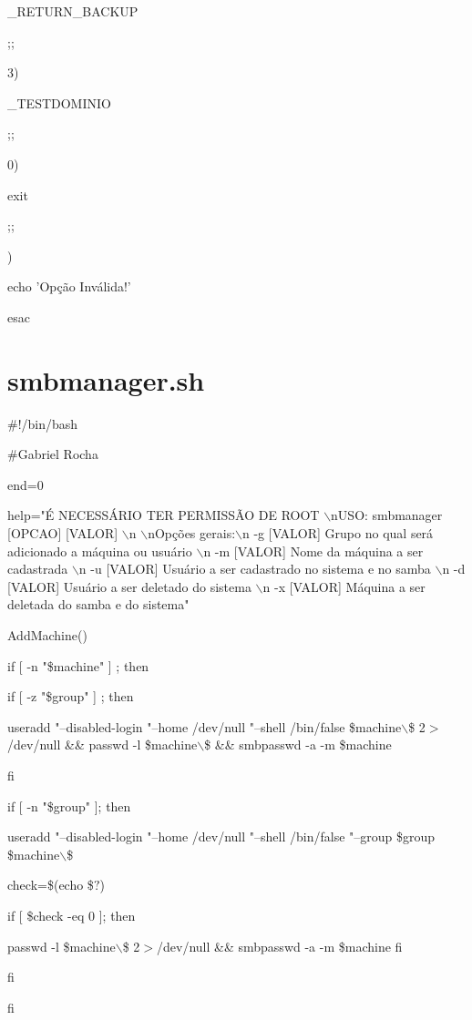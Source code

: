 {		\_RETURN\_BACKUP

                ;;  

        3)  

       \_TESTDOMINIO

                ;;  

        0)  

                exit

                ;;  

        \*)  

                echo 'Opção Inválida!'

esac

\section{smbmanager.sh}

\#!/bin/bash

\#Gabriel Rocha

end=0

help="É NECESSÁRIO TER PERMISSÃO DE ROOT $\backslash$nUSO: smbmanager [OPCAO] [VALOR] $\backslash$n 
$\backslash$nOpções gerais:$\backslash$n -g [VALOR]   Grupo no qual será adicionado a máquina ou usuário  $\backslash$n -m [VALOR]   Nome da máquina a ser cadastrada $\backslash$n -u [VALOR]   Usuário a ser cadastrado no sistema e no samba $\backslash$n -d [VALOR]   Usuário a ser deletado do sistema $\backslash$n -x [VALOR]   Máquina a ser deletada do samba e do sistema"

AddMachine(){

if [ -n "\$machine" ] ; then

    if [ -z "\$group" ] ; then

        useradd "--disabled-login "--home /dev/null "--shell /bin/false \$machine$\backslash$\$ 2$ >$/dev/null \&\& passwd -l \$machine$\backslash$\$ \&\& smbpasswd -a -m \$machine

    fi

    if [ -n "\$group" ]; then
	
        useradd "--disabled-login "--home /dev/null "--shell /bin/false "--group \$group \$machine$\backslash$\$ 

	check=\$(echo \$$?$)

		if [ \$check -eq 0 ]; then
	
 			passwd -l \$machine$\backslash$\$ 2$>$/dev/null \&\& smbpasswd -a -m \$machine 
       fi

    fi        

fi

}}

